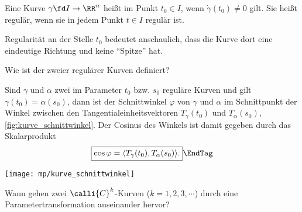   \begin{antwort}
    Eine Kurve $\gamma\fd I\to\RR^n$ heißt  im 
    Punkt $t_0\in I$, wenn $\dot{\gamma}(t_0)\not=0$ gilt. Sie heißt 
    regulär, wenn sie in jedem Punkt $t\in I$ regulär ist. 

    Regularität an der Stelle $t_0$ bedeutet anschaulich, dass die 
    Kurve dort eine eindeutige Richtung und keine 
    "`Spitze"' hat.
    \AntEnd
  \end{antwort} 

  \begin{frage} 
    Wie ist der  zweier regulärer Kurven definiert?
  \end{frage}

  \begin{antwort}
    Sind $\gamma$ und $\alpha$ zwei im Parameter $t_0$ bzw. 
    $s_0$ reguläre Kurven und gilt $\gamma(t_0)=\alpha(s_0)$, dann 
    ist der Schnittwinkel $\varphi$ von $\gamma$ und $\alpha$ 
    im Schnittpunkt der Winkel zwischen den Tangentialeinheitsvektoren 
    $T_\gamma(t_0)$ und $T_\alpha(s_0)$, \sieheAbbildung\ref{fig:kurve_schnittwinkel}. Der Cosinus des Winkels ist damit gegeben durch das Skalarprodukt
    \[
    \boxed{ \cos \varphi = \langle T_\gamma( t_0 ), T_\alpha( s_0 ) \rangle. }
    \EndTag
    \]   
    \begin{center}
      \texttt{[image: mp/kurve\_schnittwinkel]}
      \label{fig:kurve_schnittwinkel}
    \end{center}
  \end{antwort} 

  \begin{frage}\label{kurve_parametertrans}
    Wann gehen zwei $\calli{C}^k$-Kurven ($k=1,2,3,\cdots$) 
    durch eine Parametertransformation 
    auseinander hervor?
  \end{frage}


